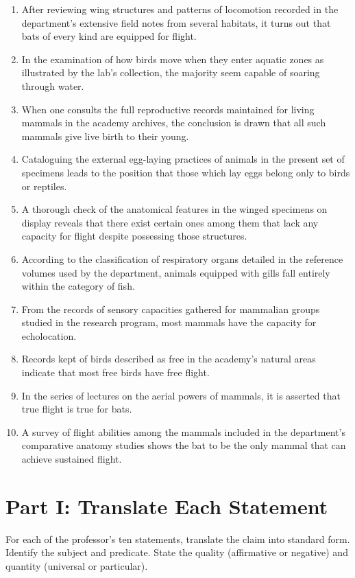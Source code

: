 \documentclass[12pt]{article}
\begin{document}
\begin{enumerate}[leftmargin=*]
\item After reviewing wing structures and patterns of locomotion recorded in the department's extensive field notes from several habitats, it turns out that bats of every kind are equipped for flight.
\item In the examination of how birds move when they enter aquatic zones as illustrated by the lab's collection, the majority seem capable of soaring through water.
\item When one consults the full reproductive records maintained for living mammals in the academy archives, the conclusion is drawn that all such mammals give live birth to their young.
\item Cataloguing the external egg-laying practices of animals in the present set of specimens leads to the position that those which lay eggs belong only to birds or reptiles.
\item A thorough check of the anatomical features in the winged specimens on display reveals that there exist certain ones among them that lack any capacity for flight despite possessing those structures.
\item According to the classification of respiratory organs detailed in the reference volumes used by the department, animals equipped with gills fall entirely within the category of fish.
\item From the records of sensory capacities gathered for mammalian groups studied in the research program, most mammals have the capacity for echolocation.
\item Records kept of birds described as free in the academy's natural areas indicate that most free birds have free flight.
\item In the series of lectures on the aerial powers of mammals, it is asserted that true flight is true for bats.
\item A survey of flight abilities among the mammals included in the department's comparative anatomy studies shows the bat to be the only mammal that can achieve sustained flight.
\end{enumerate}

\clearpage

\section*{Part I: Translate Each Statement}

For each of the professor's ten statements, translate the claim into standard form. Identify the subject and predicate. State the quality (affirmative or negative) and quantity (universal or particular). 
\end{document}
